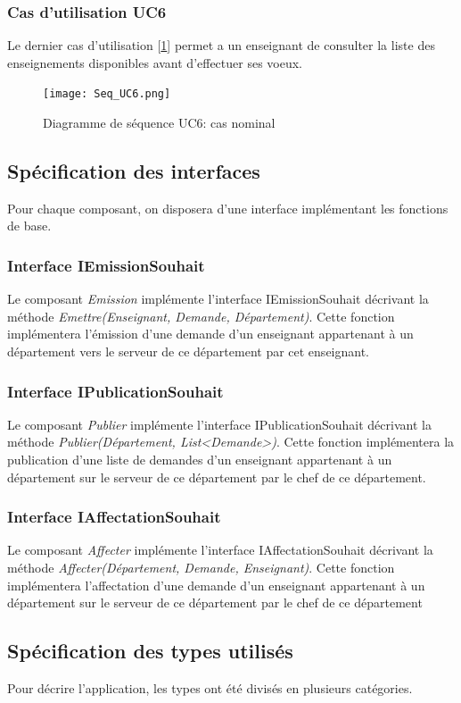 \documentclass[a4paper,11pt]{article}
\begin{document}
\subsubsection{Cas d’utilisation UC6}
Le dernier cas d'utilisation [\ref{DUC6}] permet a un enseignant de consulter la liste des enseignements disponibles avant d'effectuer ses voeux.
\begin{figure}
\centering
\texttt{[image: Seq\_UC6.png]}
\caption{Diagramme de séquence UC6: cas nominal}
\label{DUC6}
\end{figure}

\subsection{Spécification des interfaces}
Pour chaque composant, on disposera d'une interface implémentant les fonctions de base.
\subsubsection{Interface IEmissionSouhait}
Le composant \textit{Emission} implémente l'interface IEmissionSouhait décrivant la méthode \textit{Emettre(Enseignant, Demande, Département)}. Cette fonction implémentera l'émission d'une demande d'un enseignant appartenant à un département vers le serveur de ce département par cet enseignant.
\subsubsection{Interface IPublicationSouhait}
Le composant \textit{Publier} implémente l'interface IPublicationSouhait décrivant la méthode \textit{Publier(Département, List<Demande>)}. Cette fonction implémentera la publication d'une liste de demandes d'un enseignant appartenant à un département sur le serveur de ce département par le chef de ce département.
\subsubsection{Interface IAffectationSouhait}
Le composant \textit{Affecter} implémente l'interface IAffectationSouhait décrivant la méthode \textit{Affecter(Département, Demande, Enseignant)}. Cette fonction implémentera l'affectation d'une demande d'un enseignant appartenant à un département sur le serveur de ce département par le chef de ce département
\subsection{Spécification des types utilisés}
Pour décrire l'application, les types ont été divisés en plusieurs catégories.
\end{document}
